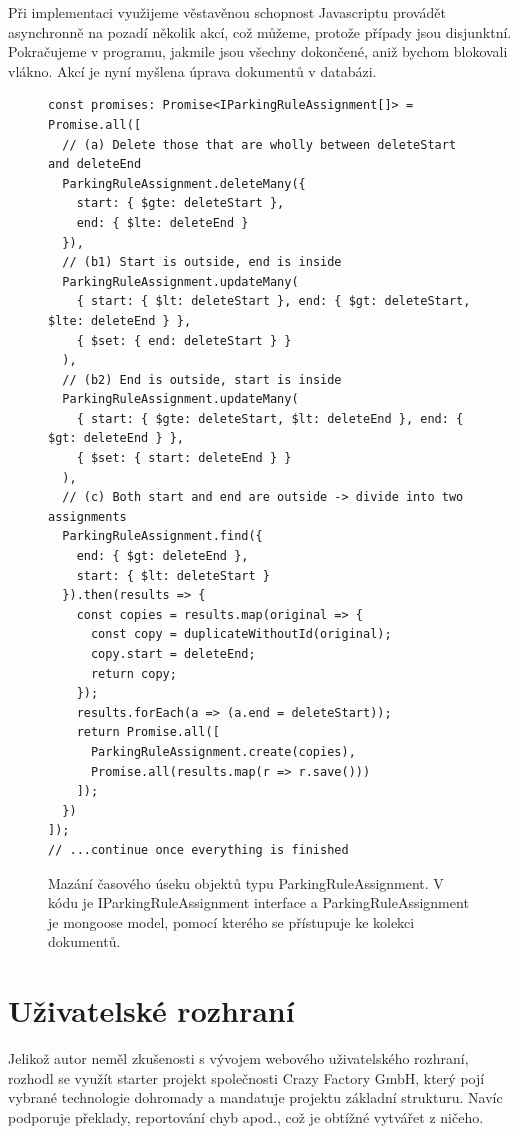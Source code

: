 Při implementaci využijeme věstavěnou schopnost Javascriptu provádět asynchronně na pozadí několik akcí, což
můžeme, protože případy jsou disjunktní. Pokračujeme v programu, jakmile jsou všechny dokončené, aniž
bychom blokovali vlákno.
Akcí je nyní myšlena úprava dokumentů v databázi.

\begin{figure}[!htb]
  \lstset{language=Javascript}
  \begin{lstlisting}
const promises: Promise<IParkingRuleAssignment[]> = Promise.all([
  // (a) Delete those that are wholly between deleteStart and deleteEnd
  ParkingRuleAssignment.deleteMany({
    start: { $gte: deleteStart },
    end: { $lte: deleteEnd }
  }),
  // (b1) Start is outside, end is inside
  ParkingRuleAssignment.updateMany(
    { start: { $lt: deleteStart }, end: { $gt: deleteStart, $lte: deleteEnd } },
    { $set: { end: deleteStart } }
  ),
  // (b2) End is outside, start is inside
  ParkingRuleAssignment.updateMany(
    { start: { $gte: deleteStart, $lt: deleteEnd }, end: { $gt: deleteEnd } },
    { $set: { start: deleteEnd } }
  ),
  // (c) Both start and end are outside -> divide into two assignments
  ParkingRuleAssignment.find({
    end: { $gt: deleteEnd },
    start: { $lt: deleteStart }
  }).then(results => {
    const copies = results.map(original => {
      const copy = duplicateWithoutId(original);
      copy.start = deleteEnd;
      return copy;
    });
    results.forEach(a => (a.end = deleteStart));
    return Promise.all([
      ParkingRuleAssignment.create(copies),
      Promise.all(results.map(r => r.save()))
    ]);
  })
]);
// ...continue once everything is finished
  \end{lstlisting}
  \caption[Mázání]{Mazání časového úseku objektů typu ParkingRuleAssignment. V kódu je IParkingRuleAssignment interface a
  ParkingRuleAssignment je mongoose model, pomocí kterého se přístupuje ke kolekci dokumentů.}
  \label{fig:pra_deleting}
\end{figure}

\section{Uživatelské rozhraní}

\noindent
Jelikož autor neměl zkušenosti s vývojem webového uživatelského rozhraní, rozhodl se využít starter projekt
společnosti Crazy Factory GmbH, který pojí vybrané technologie dohromady a mandatuje projektu základní strukturu.
Navíc podporuje překlady, reportování chyb apod., což je obtížné vytvářet z ničeho. \citep[][]{CFProj}

